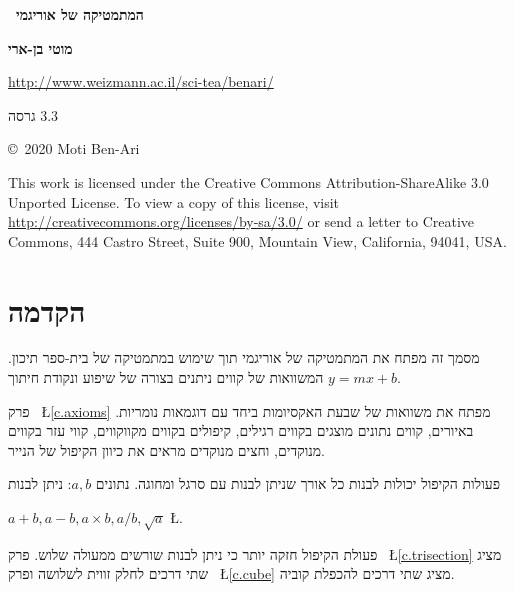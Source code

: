 
\thispagestyle{empty}

\begin{center}
\textbf{\Huge\ המתמטיקה של אוריגמי}

\bigskip
\bigskip

\textbf{\LARGE מוטי בן-ארי}

\bigskip
\bigskip
{}
\url{http://www.weizmann.ac.il/sci-tea/benari/}

\bigskip
\bigskip

{\large
גרסה
$3.3$
}
\end{center}

\vfill

\begin{small}
\begin{center}
\copyright{}\ 2020 Moti Ben-Ari
\end{center}

This work is licensed under the Creative Commons Attribution-ShareAlike 3.0 Unported License. To view a copy of this license, visit \url{http://creativecommons.org/licenses/by-sa/3.0/} or send a letter to Creative Commons, 444 Castro Street, Suite 900, Mountain View, California, 94041, USA.
\end{small}
\tableofcontents



\chapter{הקדמה}\label{c.introduction}

מסמך זה מפתח את המתמטיקה של אוריגמי תוך שימוש במתמטיקה של בית-ספר תיכון. המשוואות של קווים ניתנים בצורה של שיפוע ונקודת חיתוך
$y=mx+b$.

פרק%
~\L{\ref{c.axioms}}
מפתח את משוואות של שבעת האקסיומות ביחד עם דוגמאות נומריות. באיורים, קווים נתונים מוצגים בקווים רגילים, קיפולים בקווים מקווקווים, קווי עזר בקווים מנוקדים, וחצים מנוקדים מראים את כיוון הקיפול של הנייר.

פעולות הקיפול יכולות לבנות כל אורך שניתן לבנות עם סרגל ומחוגה. נתונים 
$a,b$:
ניתן לבנות

$a+b, a-b, a\times b, a/b, \sqrt{a}$
\L{\cite[4~]{hwa}}.

פעולת הקיפול חזקה יותר כי ניתן לבנות שורשים ממעולה שלוש. פרק%
~\L{\ref{c.trisection}}
מציג שתי דרכים לחלק זווית לשלושה ופרק%
~\L{\ref{c.cube}}
מציג שתי דרכים להכפלת קוביה.

